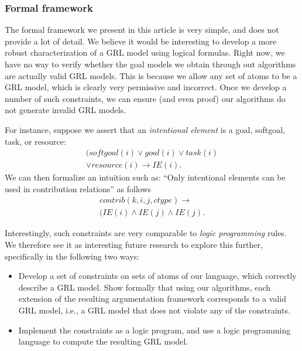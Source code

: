 \subsubsection*{Formal framework}

The formal framework we present in this article is very simple, and does not provide a lot of detail. We believe it would be interesting to develop a more robust characterization of a GRL model using logical formulas. Right now, we have no way to verify whether the goal models we obtain through out algorithms are actually valid GRL models. This is because we allow any set of atoms to be a GRL model, which is clearly very permissive and incorrect. Once we develop a number of such constraints, we can ensure (and even proof) our algorithms do not generate invalid GRL models. 

For instance, suppose we assert that an \emph{intentional element} is a goal, softgoal, task, or resource: \begin{align*}
(softgoal(i)\vee goal(i)\vee task(i)\\
\vee resource(i)\rightarrow IE(i).
\end{align*}
We can then formalize an intuition such as: ``Only intentional elements can be used in contribution relations'' as follows
\begin{align*}
contrib(k,i,j,ctype)\rightarrow \\
(IE(i)\wedge IE(j)\wedge IE(j).
\end{align*}

Interestingly, such constraints are very comparable to \emph{logic programming} rules. We therefore see it as interesting future research to explore this further, specifically in the following two ways:
\begin{itemize}
\item Develop a set of constraints on sets of atoms of our language, which correctly describe a GRL model. Show formally that using our algorithms, each extension of the resulting argumentation framework corresponds to a valid GRL model, i.e., a GRL model that does not violate any of the constraints.
\item Implement the constraints as a logic program, and use a logic programming language to compute the resulting GRL model.
\end{itemize}




\iffalse%
